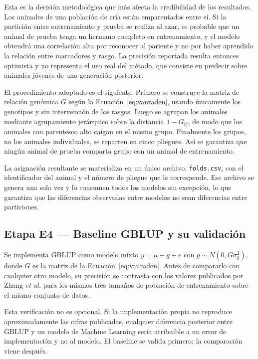 \documentclass[conference]{IEEEtran}
\begin{document}
Esta es la decisión metodológica que más afecta la credibilidad de los
resultados. Los animales de una población de cría están emparentados entre
sí. Si la partición entre entrenamiento y prueba se realiza al azar, es
probable que un animal de prueba tenga un hermano completo en
entrenamiento, y el modelo obtendrá una correlación alta por reconocer al
pariente y no por haber aprendido la relación entre marcadores y rasgo. La
precisión reportada resulta entonces optimista y no representa el uso real
del método, que consiste en predecir sobre animales jóvenes de una
generación posterior.

El procedimiento adoptado es el siguiente. Primero se construye la matriz
de relación genómica $G$ según la Ecuación~\eqref{eq:vanraden}, usando
únicamente los genotipos y sin intervención de los rasgos. Luego se
agrupan los animales mediante agrupamiento jerárquico sobre la distancia
$1 - G_{ij}$, de modo que los animales con parentesco alto caigan en el
mismo grupo. Finalmente los grupos, no los animales individuales, se
reparten en cinco pliegues. Así se garantiza que ningún animal de prueba
comparta grupo con un animal de entrenamiento.

La asignación resultante se materializa en un único archivo,
\texttt{folds.csv}, con el identificador del animal y el número de pliegue
que le corresponde. Ese archivo se genera una sola vez y lo consumen todos
los modelos sin excepción, lo que garantiza que las diferencias observadas
entre modelos no sean diferencias entre particiones.

\subsection{Etapa E4 — Baseline GBLUP y su validación}

Se implementa GBLUP como modelo mixto $y = \mu + g + e$ con
$g \sim N(0, G\sigma_g^2)$, donde $G$ es la matriz de la
Ecuación~\eqref{eq:vanraden}. Antes de compararlo con cualquier otro
modelo, su precisión se contrasta con los valores publicados por Zhang
\textit{et al.} \cite{zhang2015} para los mismos tres tamaños de población
de entrenamiento sobre el mismo conjunto de datos.

Esta verificación no es opcional. Si la implementación propia no reproduce
aproximadamente las cifras publicadas, cualquier diferencia posterior
entre GBLUP y un modelo de Machine Learning sería atribuible a un error de
implementación y no al modelo. El baseline se valida primero; la
comparación viene después.
\end{document}
